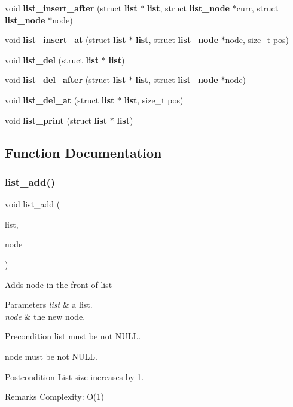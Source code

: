 \begin{DoxyCompactItemize}
\item 
void \textbf{ list\+\_\+insert\+\_\+after} (struct \textbf{ list} $\ast$\textbf{ list}, struct \textbf{ list\+\_\+node} $\ast$curr, struct \textbf{ list\+\_\+node} $\ast$node)
\item 
void \textbf{ list\+\_\+insert\+\_\+at} (struct \textbf{ list} $\ast$\textbf{ list}, struct \textbf{ list\+\_\+node} $\ast$node, size\+\_\+t pos)
\item 
void \textbf{ list\+\_\+del} (struct \textbf{ list} $\ast$\textbf{ list})
\item 
void \textbf{ list\+\_\+del\+\_\+after} (struct \textbf{ list} $\ast$\textbf{ list}, struct \textbf{ list\+\_\+node} $\ast$node)
\item 
void \textbf{ list\+\_\+del\+\_\+at} (struct \textbf{ list} $\ast$\textbf{ list}, size\+\_\+t pos)
\item 
void \textbf{ list\+\_\+print} (struct \textbf{ list} $\ast$\textbf{ list})
\end{DoxyCompactItemize}


\subsection{Function Documentation}
\mbox{\label{list_8c_a9a78b4aa6e818c4b9e3da16cf3d1e9cf}} 
\subsubsection{list\+\_\+add()}
{\footnotesize\ttfamily void list\+\_\+add (\begin{DoxyParamCaption}\item[{struct \textbf{ list} $\ast$}]{list,  }\item[{struct \textbf{ list\+\_\+node} $\ast$}]{node }\end{DoxyParamCaption})\hspace{0.3cm}{\ttfamily [inline]}}

Adds {\ttfamily node} in the front of {\ttfamily list}


\begin{DoxyParams}{Parameters}
{\em list} & a list. \\
\hline
{\em node} & the new node.\\
\hline
\end{DoxyParams}
\begin{DoxyPrecond}{Precondition}
{\ttfamily list} must be not N\+U\+LL. 

{\ttfamily node} must be not N\+U\+LL.
\end{DoxyPrecond}
\begin{DoxyPostcond}{Postcondition}
List size increases by 1.
\end{DoxyPostcond}
\begin{DoxyRemark}{Remarks}
Complexity\+: O(1) 
\end{DoxyRemark}
\mbox{\label{list_8c_a3e71507d9a07668a357907d4515336de}} 
